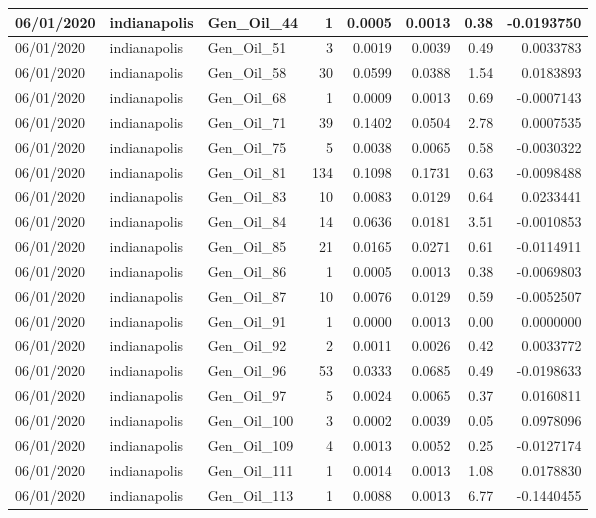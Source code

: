\documentclass[
  letterpaper,
  DIV=11,
  numbers=noendperiod]{scrartcl}
\begin{document}
\begin{tabular}{l|l|l|r|r|r|r|r}
\hline
06/01/2020 & indianapolis & Gen\_Oil\_44 & 1 & 0.0005 & 0.0013 & 0.38 & -0.0193750\\
\hline
06/01/2020 & indianapolis & Gen\_Oil\_51 & 3 & 0.0019 & 0.0039 & 0.49 & 0.0033783\\
\hline
06/01/2020 & indianapolis & Gen\_Oil\_58 & 30 & 0.0599 & 0.0388 & 1.54 & 0.0183893\\
\hline
06/01/2020 & indianapolis & Gen\_Oil\_68 & 1 & 0.0009 & 0.0013 & 0.69 & -0.0007143\\
\hline
06/01/2020 & indianapolis & Gen\_Oil\_71 & 39 & 0.1402 & 0.0504 & 2.78 & 0.0007535\\
\hline
06/01/2020 & indianapolis & Gen\_Oil\_75 & 5 & 0.0038 & 0.0065 & 0.58 & -0.0030322\\
\hline
06/01/2020 & indianapolis & Gen\_Oil\_81 & 134 & 0.1098 & 0.1731 & 0.63 & -0.0098488\\
\hline
06/01/2020 & indianapolis & Gen\_Oil\_83 & 10 & 0.0083 & 0.0129 & 0.64 & 0.0233441\\
\hline
06/01/2020 & indianapolis & Gen\_Oil\_84 & 14 & 0.0636 & 0.0181 & 3.51 & -0.0010853\\
\hline
06/01/2020 & indianapolis & Gen\_Oil\_85 & 21 & 0.0165 & 0.0271 & 0.61 & -0.0114911\\
\hline
06/01/2020 & indianapolis & Gen\_Oil\_86 & 1 & 0.0005 & 0.0013 & 0.38 & -0.0069803\\
\hline
06/01/2020 & indianapolis & Gen\_Oil\_87 & 10 & 0.0076 & 0.0129 & 0.59 & -0.0052507\\
\hline
06/01/2020 & indianapolis & Gen\_Oil\_91 & 1 & 0.0000 & 0.0013 & 0.00 & 0.0000000\\
\hline
06/01/2020 & indianapolis & Gen\_Oil\_92 & 2 & 0.0011 & 0.0026 & 0.42 & 0.0033772\\
\hline
06/01/2020 & indianapolis & Gen\_Oil\_96 & 53 & 0.0333 & 0.0685 & 0.49 & -0.0198633\\
\hline
06/01/2020 & indianapolis & Gen\_Oil\_97 & 5 & 0.0024 & 0.0065 & 0.37 & 0.0160811\\
\hline
06/01/2020 & indianapolis & Gen\_Oil\_100 & 3 & 0.0002 & 0.0039 & 0.05 & 0.0978096\\
\hline
06/01/2020 & indianapolis & Gen\_Oil\_109 & 4 & 0.0013 & 0.0052 & 0.25 & -0.0127174\\
\hline
06/01/2020 & indianapolis & Gen\_Oil\_111 & 1 & 0.0014 & 0.0013 & 1.08 & 0.0178830\\
\hline
06/01/2020 & indianapolis & Gen\_Oil\_113 & 1 & 0.0088 & 0.0013 & 6.77 & -0.1440455\\

\end{tabular}
\end{document}
